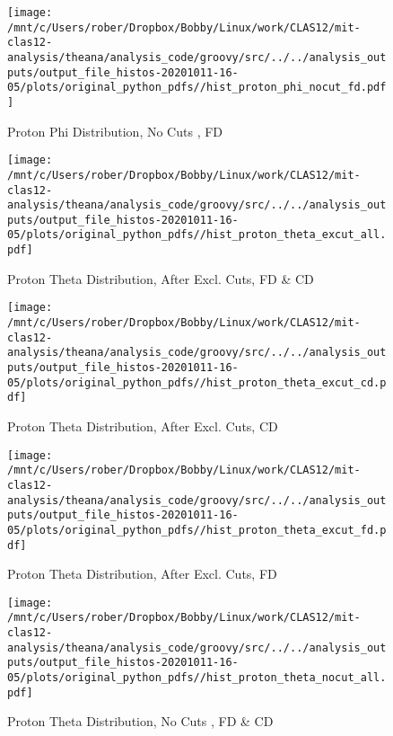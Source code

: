 \documentclass{article}
\begin{document}
\begin{landscape}
    \begin{figure}[h]
        \centering

        \texttt{[image: /mnt/c/Users/rober/Dropbox/Bobby/Linux/work/CLAS12/mit-clas12-analysis/theana/analysis\_code/groovy/src/../../analysis\_outputs/output\_file\_histos-20201011-16-05/plots/original\_python\_pdfs//hist\_proton\_phi\_nocut\_fd.pdf]}
        \captionsetup{textformat=empty,labelformat=blank}
        \caption{Proton Phi Distribution, No Cuts , FD}
    \end{figure}
    \clearpage
    
    \begin{figure}[h]
        \centering

        \texttt{[image: /mnt/c/Users/rober/Dropbox/Bobby/Linux/work/CLAS12/mit-clas12-analysis/theana/analysis\_code/groovy/src/../../analysis\_outputs/output\_file\_histos-20201011-16-05/plots/original\_python\_pdfs//hist\_proton\_theta\_excut\_all.pdf]}
        \captionsetup{textformat=empty,labelformat=blank}
        \caption{Proton Theta Distribution, After Excl. Cuts, FD \& CD}
    \end{figure}
    \clearpage
    
    \begin{figure}[h]
        \centering

        \texttt{[image: /mnt/c/Users/rober/Dropbox/Bobby/Linux/work/CLAS12/mit-clas12-analysis/theana/analysis\_code/groovy/src/../../analysis\_outputs/output\_file\_histos-20201011-16-05/plots/original\_python\_pdfs//hist\_proton\_theta\_excut\_cd.pdf]}
        \captionsetup{textformat=empty,labelformat=blank}
        \caption{Proton Theta Distribution, After Excl. Cuts, CD}
    \end{figure}
    \clearpage
    
    \begin{figure}[h]
        \centering

        \texttt{[image: /mnt/c/Users/rober/Dropbox/Bobby/Linux/work/CLAS12/mit-clas12-analysis/theana/analysis\_code/groovy/src/../../analysis\_outputs/output\_file\_histos-20201011-16-05/plots/original\_python\_pdfs//hist\_proton\_theta\_excut\_fd.pdf]}
        \captionsetup{textformat=empty,labelformat=blank}
        \caption{Proton Theta Distribution, After Excl. Cuts, FD}
    \end{figure}
    \clearpage
    
    \begin{figure}[h]
        \centering

        \texttt{[image: /mnt/c/Users/rober/Dropbox/Bobby/Linux/work/CLAS12/mit-clas12-analysis/theana/analysis\_code/groovy/src/../../analysis\_outputs/output\_file\_histos-20201011-16-05/plots/original\_python\_pdfs//hist\_proton\_theta\_nocut\_all.pdf]}
        \captionsetup{textformat=empty,labelformat=blank}
        \caption{Proton Theta Distribution, No Cuts , FD \& CD}
    \end{figure}
    \clearpage
    

\end{landscape}
\end{document}
